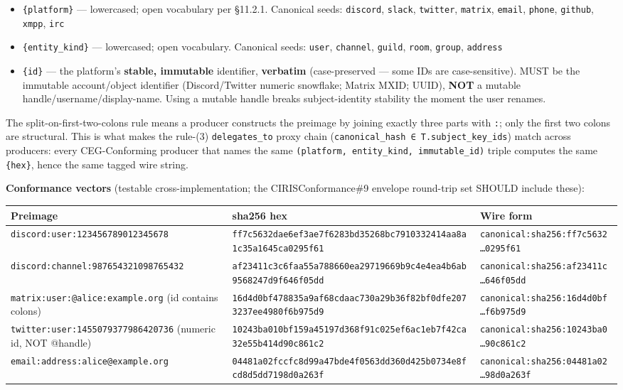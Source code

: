 \documentclass[11pt]{article}
\begin{document}
\begin{itemize}\setlength\itemsep{0pt}
\item \texttt{\{platform\}} — lowercased; open vocabulary per §11.2.1. Canonical seeds: \texttt{discord}, \texttt{slack}, \texttt{twitter}, \texttt{matrix}, \texttt{email}, \texttt{phone}, \texttt{github}, \texttt{xmpp}, \texttt{irc}
\item \texttt{\{entity\_kind\}} — lowercased; open vocabulary. Canonical seeds: \texttt{user}, \texttt{channel}, \texttt{guild}, \texttt{room}, \texttt{group}, \texttt{address}
\item \texttt{\{id\}} — the platform's \textbf{stable, immutable} identifier, \textbf{verbatim} (case-preserved — some IDs are case-sensitive). MUST be the immutable account/object identifier (Discord/Twitter numeric snowflake; Matrix MXID; UUID), \textbf{NOT} a mutable handle/username/display-name. Using a mutable handle breaks subject-identity stability the moment the user renames.
\end{itemize}


The split-on-first-two-colons rule means a producer constructs the preimage by joining exactly three parts with \texttt{:}; only the first two colons are structural. This is what makes the rule-(3) \texttt{delegates\_to} proxy chain (\texttt{canonical\_hash ∈ T.subject\_key\_ids}) match across producers: every CEG-Conforming producer that names the same \texttt{(platform, entity\_kind, immutable\_id)} triple computes the same \texttt{\{hex\}}, hence the same tagged wire string.


\textbf{Conformance vectors} (testable cross-implementation; the CIRISConformance\#9 envelope round-trip set SHOULD include these):


{\footnotesize
\begin{longtable}{|p{5.33cm}|p{5.33cm}|p{5.33cm}|}\hline
\textbf{Preimage} & \textbf{sha256 hex} & \textbf{Wire form} \\ \hline\endhead
\texttt{discord:user:123456789012345678} & \texttt{ff7c5632dae6ef3ae7f6283bd35268bc7910332414aa8a1c35a1645ca0295f61} & \texttt{canonical:sha256:ff7c5632…0295f61} \\ \hline
\texttt{discord:channel:987654321098765432} & \texttt{af23411c3c6faa55a788660ea29719669b9c4e4ea4b6ab9568247d9f646f05dd} & \texttt{canonical:sha256:af23411c…646f05dd} \\ \hline
\texttt{matrix:user:@alice:example.org} (id contains colons) & \texttt{16d4d0bf478835a9af68cdaac730a29b36f82bf0dfe2073237ee4980f6b975d9} & \texttt{canonical:sha256:16d4d0bf…f6b975d9} \\ \hline
\texttt{twitter:user:1455079377986420736} (numeric id, NOT @handle) & \texttt{10243ba010bf159a45197d368f91c025ef6ac1eb7f42ca32e55b414d90c861c2} & \texttt{canonical:sha256:10243ba0…90c861c2} \\ \hline
\texttt{email:address:alice@example.org} & \texttt{04481a02fccfc8d99a47bde4f0563dd360d425b0734e8fcd8d5dd7198d0a263f} & \texttt{canonical:sha256:04481a02…98d0a263f} \\ \hline
\end{longtable}}
\end{document}
